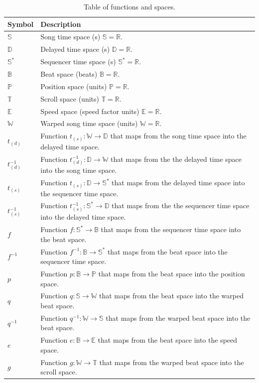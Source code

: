 \documentclass[a4paper,9pt]{article}
\begin{document}
    \begin{table}[htbp]
	    \centering
	    \begin{tabular}{lp{11cm}}
		    Symbol & Description \\\toprule
		    $ \mathbb{S} $ & Song time space (s) $ \mathbb{S} = \mathbb{R} $.\\
		    $ \mathbb{D} $ & Delayed time space (s) $ \mathbb{D} = \mathbb{R} $.\\
		    $ \mathbb{S^{*}} $ & Sequencer time space (s) $ \mathbb{S^{*}} = \mathbb{R} $.\\
		    $ \mathbb{B} $ & Beat space (beats) $ \mathbb{B} = \mathbb{R} $.\\
		    $ \mathbb{P} $ & Position space (units) $ \mathbb{P} = \mathbb{R} $.\\
		    $ \mathbb{T} $ & Scroll space (units) $ \mathbb{T} = \mathbb{R} $.\\
		    $ \mathbb{E} $ & Speed space (speed factor units) $ \mathbb{E} = \mathbb{R} $.\\
		    $ \mathbb{W} $ & Warped song time space (units) $ \mathbb{W} = \mathbb{R} $.\\
		    $ t_{(d)} $ & Function  $ t_{(s)}: \mathbb{W}\rightarrow \mathbb{D} $ that maps from the song time space into the delayed time space.\\
	    $ t_{(d)}^{-1} $ & Function  $ t_{(d)}^{-1}: \mathbb{D}\rightarrow \mathbb{W} $ that maps from the the delayed time space into the song time space.\\
		    $ t_{(s)} $ & Function  $ t_{(s)}: \mathbb{D}\rightarrow \mathbb{S^{*}} $ that maps from the delayed time space into the sequencer time space.\\
	    $ t_{(s)}^{-1}$ & Function  $ t_{(s)}^{-1}: \mathbb{S^{*}}\rightarrow \mathbb{D} $ that maps from the the sequencer time space into the delayed time space.\\
		    $ f $ & Function $ f: \mathbb{S^{*}}\rightarrow \mathbb{B} $ that maps from the sequencer time space into the beat space. \\
		    $ f^{-1} $ & Function $ f^{-1}: \mathbb{B}\rightarrow \mathbb{S^{*}} $ that maps from the beat space into the sequencer time space.\\
		    $ p $ & Function $ p: \mathbb{B}\rightarrow \mathbb{P} $ that maps from the beat space into the position space.\\
		    $ q $ & Function $ q: \mathbb{S}\rightarrow \mathbb{W} $ that maps from the beat space into the warped beat space.\\
		    $ q^{-1} $ & Function $ q^{-1}: \mathbb{W}\rightarrow \mathbb{S} $ that maps from the warped beat space into the beat space.\\
		    $ e $ & Function $ e: \mathbb{B}\rightarrow \mathbb{E} $ that maps from the beat space into the speed space.\\
		    $ g $ & Function $ g: \mathbb{W}\rightarrow \mathbb{T} $ that maps from the warped beat space into the scroll space.\\
		    \bottomrule
	    \end{tabular}
	    \caption{Table of functions and spaces.}
	    \label{tab:symbol-table}
    \end{table}
\end{document}
